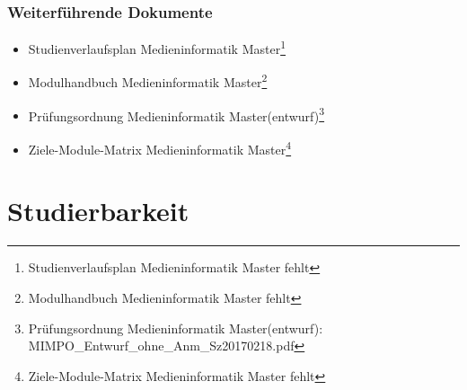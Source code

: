 \subsection{Weiterführende
Dokumente}\label{weiterfuxfchrende-dokumente-3}

\begin{itemize}
\tightlist
\item
  Studienverlaufsplan Medieninformatik Master\footnote{Studienverlaufsplan
    Medieninformatik Master fehlt}
\item
  Modulhandbuch Medieninformatik Master\footnote{Modulhandbuch
    Medieninformatik Master fehlt}
\item
  Prüfungsordnung Medieninformatik Master(entwurf)\footnote{Prüfungsordnung
    Medieninformatik Master(entwurf):
    MIMPO\_Entwurf\_ohne\_Anm\_Sz20170218.pdf}
\item
  Ziele-Module-Matrix Medieninformatik Master\footnote{Ziele-Module-Matrix
    Medieninformatik Master fehlt}
\end{itemize}

\chapter{Studierbarkeit}\label{studierbarkeit}

